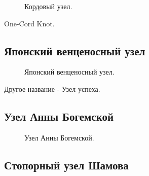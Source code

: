 \begin{figure}[H]\centering
	\begin{minipage}{1\linewidth}
		\begin{center}
			\tcbox[enhanced jigsaw,colframe=black,opacityframe=0.5,opacityback=0.5]
			{\centering{}}
		\end{center}
	\end{minipage}
\caption{Кордовый узел.}
	\label{ris:Kord}
\end{figure}

One-Cord Knot.

\subsection{Японский венценосный узел}

\begin{figure}[H]\centering
	\begin{minipage}{1\linewidth}
		\begin{center}
			\tcbox[enhanced jigsaw,colframe=black,opacityframe=0.5,opacityback=0.5]
			{\centering{}}
		\end{center}
	\end{minipage}
\caption{Японский венценосный узел.}
	\label{ris:Japan}
\end{figure}

Другое название - Узел успеха.

\subsection{Узел Анны Богемской}

\begin{figure}[H]\centering
	\begin{minipage}{1\linewidth}
		\begin{center}
			\tcbox[enhanced jigsaw,colframe=black,opacityframe=0.5,opacityback=0.5]
			{\centering{}}
		\end{center}
	\end{minipage}
\caption{Узел Анны Богемской.}
	\label{ris:Bogemia}
\end{figure}

\subsection{Стопорный узел Шамова}

